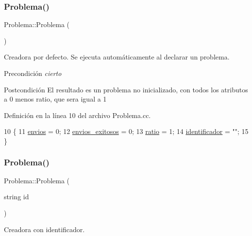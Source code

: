 \subsubsection{\texorpdfstring{Problema()}{Problema()}\hspace{0.1cm}{\footnotesize\ttfamily [1/2]}}
{\footnotesize\ttfamily Problema\+::\+Problema (\begin{DoxyParamCaption}{ }\end{DoxyParamCaption})}



Creadora por defecto. Se ejecuta automáticamente al declarar un problema. 

\begin{DoxyPrecond}{Precondición}
{\itshape cierto} 
\end{DoxyPrecond}
\begin{DoxyPostcond}{Postcondición}
El resultado es un problema no inicializado, con todos los atributos a 0 menos ratio, que sera igual a 1 
\end{DoxyPostcond}


Definición en la línea 10 del archivo Problema.\+cc.


\begin{DoxyCode}
10                    \{
11     \mbox{\hyperlink{class_problema_aaef8dcb723fa829a052517a00aed003e}{envios}} = 0;
12     \mbox{\hyperlink{class_problema_ad8f0dfd65c2673395ad72ae9817cb7ae}{envios\_exitosos}} = 0;
13     \mbox{\hyperlink{class_problema_acc3d2ce24418ad68650108de4b603d99}{ratio}} = 1;
14     \mbox{\hyperlink{class_problema_ac59427a22875e6b6a35490628a220ba6}{identificador}} = \textcolor{stringliteral}{""};
15 \}
\end{DoxyCode}
\mbox{\label{class_problema_ae114210c654baa6e728c412f7e64cb80}} 
\subsubsection{\texorpdfstring{Problema()}{Problema()}\hspace{0.1cm}{\footnotesize\ttfamily [2/2]}}
{\footnotesize\ttfamily Problema\+::\+Problema (\begin{DoxyParamCaption}\item[{string}]{id }\end{DoxyParamCaption})}



Creadora con identificador. 

